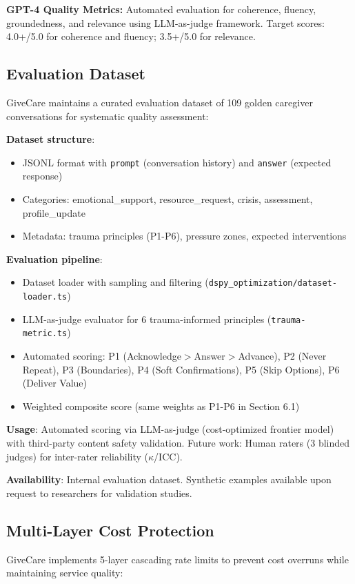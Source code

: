 \documentclass{article}
\begin{document}
\textbf{GPT-4 Quality Metrics:} Automated evaluation for coherence, fluency, groundedness, and relevance using LLM-as-judge framework. Target scores: 4.0+/5.0 for coherence and fluency; 3.5+/5.0 for relevance.

%
\subsection{Evaluation Dataset}%
\label{subsec:EvaluationDataset}%
GiveCare maintains a curated evaluation dataset of 109 golden caregiver conversations for systematic quality assessment:

\textbf{Dataset structure}:
\begin{itemize}
    \item JSONL format with \texttt{prompt} (conversation history) and \texttt{answer} (expected response)
    \item Categories: emotional\_support, resource\_request, crisis, assessment, profile\_update
    \item Metadata: trauma principles (P1-P6), pressure zones, expected interventions
\end{itemize}

\textbf{Evaluation pipeline}:
\begin{itemize}
    \item Dataset loader with sampling and filtering (\texttt{dspy\_optimization/dataset-loader.ts})
    \item LLM-as-judge evaluator for 6 trauma-informed principles (\texttt{trauma-metric.ts})
    \item Automated scoring: P1 (Acknowledge$>$Answer$>$Advance), P2 (Never Repeat), P3 (Boundaries), P4 (Soft Confirmations), P5 (Skip Options), P6 (Deliver Value)
    \item Weighted composite score (same weights as P1-P6 in Section 6.1)
\end{itemize}

\textbf{Usage}: Automated scoring via LLM-as-judge (cost-optimized frontier model) with third-party content safety validation. Future work: Human raters (3 blinded judges) for inter-rater reliability ($\kappa$/ICC).

\textbf{Availability}: Internal evaluation dataset. Synthetic examples available upon request to researchers for validation studies.

%
\subsection{Multi-Layer Cost Protection}%
\label{subsec:MultiLayerCostProtection}%
GiveCare implements 5-layer cascading rate limits to prevent cost overruns while maintaining service quality:
\end{document}
